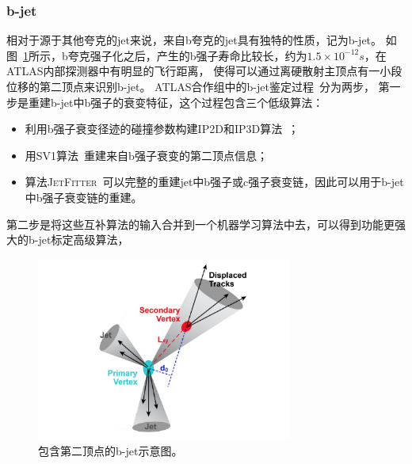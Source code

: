 \subsubsection{b-jet}
\label{sec:BJET}

相对于源于其他夸克的jet来说，来自b夸克的jet具有独特的性质，记为b-jet。
如图~\ref{fig:ATLASBJET1}所示，b夸克强子化之后，产生的b强子寿命比较长，约为$1.5\times10^{-12}s$，在ATLAS内部探测器中有明显的飞行距离，
使得可以通过离硬散射主顶点有一小段位移的第二顶点来识别b-jet。
ATLAS合作组中的b-jet鉴定过程~\cite{BTAGGING}分为两步，
第一步是重建b-jet中b强子的衰变特征，这个过程包含三个低级算法：
\begin{itemize}
	\item 利用b强子衰变径迹的碰撞参数构建\textsc{IP2D}和\textsc{IP3D}算法~\cite{IPTD}；
	\item 用\textsc{SV1}算法~\cite{SVN}重建来自b强子衰变的第二顶点信息；
	\item 算法\textsc{JetFitter}~\cite{JETFT}可以完整的重建jet中b强子或c强子衰变链，因此可以用于b-jet中b强子衰变链的重建。
\end{itemize}
第二步是将这些互补算法的输入合并到一个机器学习算法中去，可以得到功能更强大的b-jet标定高级算法，


\begin{figure}
  \begin{center}
    \includegraphics[width=0.75\textwidth]{figuresEXP/ATLASBJET1.jpg}
  \end{center}
  \caption{
包含第二顶点的b-jet示意图。
  }
    \label{fig:ATLASBJET1}
\end{figure}


